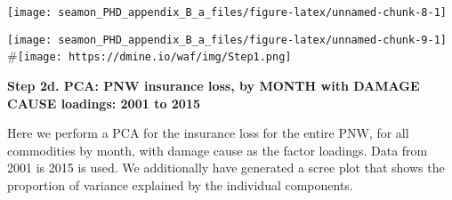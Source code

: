 \documentclass[]{article}
\newenvironment{Shaded}{\begin{snugshade}}{\end{snugshade}}
\newcommand{\CommentTok}[1]{\textcolor[rgb]{0.56,0.35,0.01}{\textit{#1}}}
\newcommand{\DataTypeTok}[1]{\textcolor[rgb]{0.13,0.29,0.53}{#1}}
\newcommand{\DecValTok}[1]{\textcolor[rgb]{0.00,0.00,0.81}{#1}}
\newcommand{\KeywordTok}[1]{\textcolor[rgb]{0.13,0.29,0.53}{\textbf{#1}}}
\newcommand{\NormalTok}[1]{#1}
\newcommand{\OperatorTok}[1]{\textcolor[rgb]{0.81,0.36,0.00}{\textbf{#1}}}
\newcommand{\StringTok}[1]{\textcolor[rgb]{0.31,0.60,0.02}{#1}}
\begin{document}
\texttt{[image: seamon\_PHD\_appendix\_B\_a\_files/figure-latex/unnamed-chunk-8-1]}

\begin{Shaded}
\end{Shaded}

\texttt{[image: seamon\_PHD\_appendix\_B\_a\_files/figure-latex/unnamed-chunk-9-1]}
\#\texttt{[image: https://dmine.io/waf/img/Step1.png]}

\textbf{Step 2d. PCA: PNW insurance loss, by MONTH with DAMAGE CAUSE
loadings: 2001 to 2015}

Here we perform a PCA for the insurance loss for the entire PNW, for all
commodities by month, with damage cause as the factor loadings. Data
from 2001 is 2015 is used. We additionally have generated a scree plot
that shows the proportion of variance explained by the individual
components.
\end{document}
